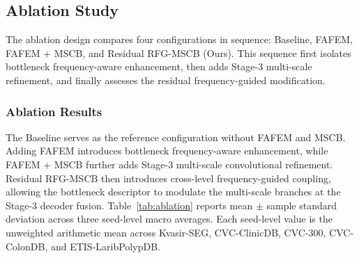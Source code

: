 \subsection{Ablation Study}\label{ablation-study}

The ablation design compares four configurations in sequence: Baseline,
FAFEM, FAFEM + MSCB, and Residual RFG-MSCB (Ours). This sequence first isolates
bottleneck frequency-aware enhancement, then adds Stage-3 multi-scale refinement,
and finally assesses the residual frequency-guided modification.

\subsubsection{Ablation Results}

The Baseline serves as the reference configuration without FAFEM and MSCB. Adding
FAFEM introduces bottleneck frequency-aware enhancement, while FAFEM + MSCB further
adds Stage-3 multi-scale convolutional refinement. Residual RFG-MSCB then introduces
cross-level frequency-guided coupling, allowing the bottleneck descriptor to modulate
the multi-scale branches at the Stage-3 decoder fusion. Table~\ref{tab:ablation}
reports mean $\pm$ sample standard deviation across three seed-level macro
averages. Each seed-level value is the unweighted arithmetic mean across
Kvasir-SEG, CVC-ClinicDB, CVC-300, CVC-ColonDB, and ETIS-LaribPolypDB.


